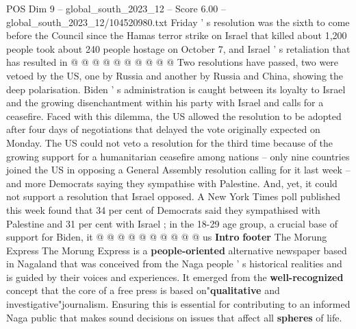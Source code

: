 \begin{textsample}{POS Dim 9 – global\_south\_2023\_12 – Score 6.00 – global\_south\_2023\_12/104520980.txt}
Friday ' s resolution was the sixth to come before the Council since the Hamas terror strike on Israel that killed about 1,200 people took about 240 people hostage on October 7, and Israel ' s retaliation that has resulted in @ @ @ @ @ @ @ @ @ @ Two resolutions have passed, two were vetoed by the US, one by Russia and another by Russia and China, showing the deep polarisation.
Biden ' s administration is caught between its loyalty to Israel and the growing disenchantment within his party with Israel and calls for a ceasefire.
Faced with this dilemma, the US allowed the resolution to be adopted after four days of negotiations that delayed the vote originally expected on Monday.
The US could not veto a resolution for the third time because of the growing support for a humanitarian ceasefire among nations -- only nine countries joined the US in opposing a General Assembly resolution calling for it last week -- and more Democrats saying they sympathise with Palestine.
And, yet, it could not support a resolution that Israel opposed.
A New York Times poll published this week found that 34 per cent of Democrats said they sympathised with Palestine and 31 per cent with Israel ; in the 18-29 age group, a crucial base of support for Biden, it @ @ @ @ @ @ @ @ @ @ us \textbf{Intro} \textbf{footer} The Morung Express The Morung Express is a \textbf{people-oriented} alternative newspaper based in Nagaland that was conceived from the Naga people ' s historical realities and is guided by their voices and experiences.
It emerged from the \textbf{well-recognized} concept that the core of a free press is based on"\textbf{qualitative} and investigative"journalism.
Ensuring this is essential for contributing to an informed Naga public that makes sound decisions on issues that affect all \textbf{spheres} of life.

\end{textsample}
